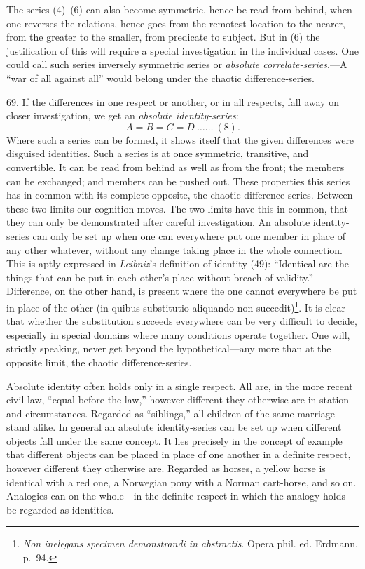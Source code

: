 \documentclass[12pt,a4paper]{book}
\newcommand{\opage}[1]{\marginnote{\footnotesize\textit{[#1]}}}
\begin{document}
The series (4)--(6) can also become symmetric, hence be read from behind,
when one reverses the relations, hence goes from the remotest location to
the nearer, from the greater to the smaller, from predicate to subject. But
in (6) the justification of this will require a special investigation in the
individual cases. One could call such series inversely symmetric series or
\emph{absolute correlate-series}.---A ``war of all against all'' would belong
under the chaotic difference-series.

69. If the differences in one respect or another, or in all respects, fall
away on closer investigation, we get an \emph{absolute identity-series}:
\opage{170}\[ A = B = C = D \ \ldots\ldots\ (8). \]
Where such a series can be formed, it shows itself that the given
differences were disguised identities. Such a series is at once symmetric,
transitive, and convertible. It can be read from behind as well as from the
front; the members can be exchanged; and members can be pushed out. These
properties this series has in common with its complete opposite, the chaotic
difference-series. Between these two limits our cognition moves. The two
limits have this in common, that they can only be demonstrated after careful
investigation. An absolute identity-series can only be set up when one can
everywhere put one member in place of any other whatever, without any change
taking place in the whole connection. This is aptly expressed in
\emph{Leibniz}'s definition of identity (49): ``Identical are the things
that can be put in each other's place without breach of validity.''
Difference, on the other hand, is present where the one cannot everywhere be
put in place of the other (in quibus substitutio aliquando non
succedit)\footnote{\emph{Non inelegans specimen demonstrandi in abstractis}.
Opera phil. ed. Erdmann. p.~94.}. It is clear that whether the substitution
succeeds everywhere can be very difficult to decide, especially in special
domains where many conditions operate together. One will, strictly speaking,
never get beyond the hypothetical---any more than at the opposite limit, the
chaotic difference-series.

Absolute identity often holds only in a single respect. All are, in the more
recent civil law, ``equal before the law,'' however different they otherwise
are in station and circumstances. Regarded as ``siblings,'' all children of
the same marriage stand alike. In general an absolute identity-series can be
set up when different objects fall under the same concept. It lies precisely
in the concept of example that different objects can be placed in place of
one another in a definite respect, however different they otherwise are.
Regarded as horses, a yellow horse is identical with a red one, a Norwegian
pony with a Norman cart-horse, and so on. Analogies can on the whole---in
the definite respect in which the analogy holds---be regarded as identities.
\end{document}
